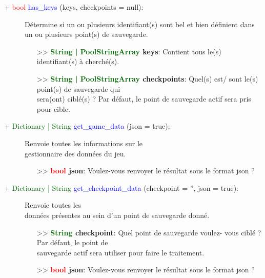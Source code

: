 \documentclass[a4paper, 11pt]{article}
\begin{document}
	\newpage \begin{description}
		\item [+ \textcolor{red}{bool} \textcolor{blue}{has\_keys} (keys, checkpoints = null):] Détermine si
		un ou plusieurs identifiant(s) sont bel et bien définient dans un ou plusieurs point(s) de
		sauvegarde.
		\begin{itemize}
			\item [>> \textbf{\textcolor{darkgreen}{String | PoolStringArray} keys}:] Contient tous le(s)
			identifiant(s) à cherché(s).
			\item [>> \textbf{\textcolor{darkgreen}{String | PoolStringArray} checkpoints}:] Quel(s) est/
			sont le(s) point(s) de sauvegarde qui \\sera(ont) ciblé(s) ? Par défaut, le point de sauvegarde
			actif sera pris pour cible.\\
		\end{itemize}
	\end{description}
	\begin{description}
		\item [+ \textcolor{darkgreen}{Dictionary | String} \textcolor{blue}{get\_game\_data} (json =
		true):] Renvoie toutes les informations sur le \\gestionnaire des données du jeu.
		\begin{itemize}
			\item [>> \textbf{\textcolor{red}{bool} json}:] Voulez-vous renvoyer le résultat sous le format 
			json ?\\
		\end{itemize}
	\end{description}
	\begin{description}
		\item [+ \textcolor{darkgreen}{Dictionary | String} \textcolor{blue}{get\_checkpoint\_data}
		(checkpoint = '', json = true):] Renvoie toutes les \\données présentes au sein d'un point de
		sauvegarde donné.
		\begin{itemize}
			\item [>> \textbf{\textcolor{darkgreen}{String} checkpoint}:] Quel point de sauvegarde voulez-
			vous ciblé ? Par défaut, le point de \\sauvegarde actif sera utiliser pour faire le traitement.
			\item [>> \textbf{\textcolor{red}{bool} json}:] Voulez-vous renvoyer le résultat sous le format 
			json ?\\
		\end{itemize}
	\end{description}
\end{document}
